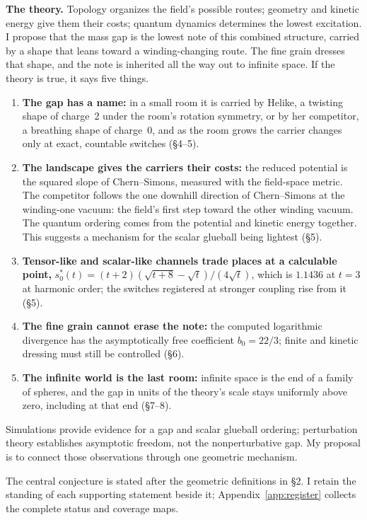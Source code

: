 \textbf{The theory.} Topology organizes the field's possible routes; geometry and kinetic energy give them their costs;
quantum dynamics determines the lowest excitation. I propose that the mass gap is the lowest note of this combined
structure, carried by a shape that leans toward a winding-changing route. The fine grain dresses that shape, and the
note is inherited all the way out to infinite space. If the theory is true, it says five things.
\begin{enumerate}
\item \textbf{The gap has a name:} in a small room it is carried by Helike, a twisting shape of charge~2 under the room's rotation symmetry, or by
her competitor, a breathing shape of charge~0, and as the room grows the carrier changes only at exact, countable
switches (\S4--5). \item \textbf{The landscape gives the carriers their costs:} the reduced potential is the squared slope
of Chern--Simons, measured with the field-space metric. The competitor follows the one downhill direction of
Chern--Simons at the winding-one vacuum: the field's first step toward the other winding vacuum. The quantum ordering
comes from the potential and kinetic energy together. This suggests a mechanism for the scalar glueball being
lightest (\S5). \item \textbf{Tensor-like and scalar-like channels trade places at a
calculable point,} $s_0^*(t)=(t+2)(\sqrt{t+8}-\sqrt t)/(4\sqrt t)$, which is $1.1436$ at $t=3$ at harmonic order; the switches registered at stronger coupling rise from it (\S5). \item \textbf{The
fine grain cannot erase the note:} the computed logarithmic divergence has the asymptotically free coefficient
$b_0=22/3$; finite and kinetic dressing must still be controlled (\S6). \item \textbf{The infinite world is the last room:} infinite
space is the end of a family of spheres, and the gap in units of the theory's scale stays uniformly above zero,
including at that end (\S7--8).

\end{enumerate}
Simulations provide evidence for a gap and scalar glueball ordering; perturbation theory establishes asymptotic freedom,
not the nonperturbative gap. My proposal is to connect those observations through one geometric mechanism.


The central conjecture is stated after the geometric definitions in \S2. I retain the standing of each supporting
statement beside it; Appendix~\ref{app:register} collects the complete status and coverage maps.

